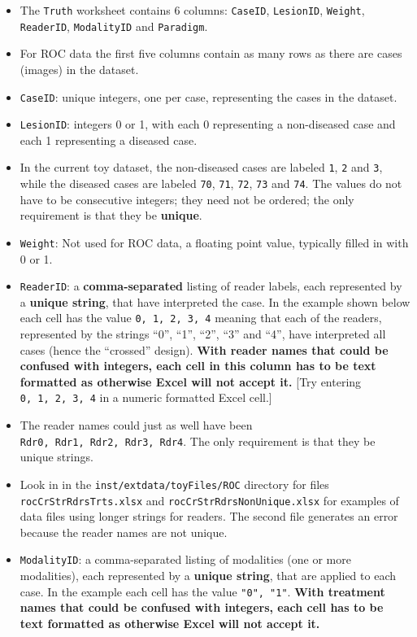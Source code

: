 \documentclass[
]{book}
\providecommand{\tightlist}{%
  \setlength{\itemsep}{0pt}\setlength{\parskip}{0pt}}
\begin{document}
\begin{itemize}
\tightlist
\item
  The \texttt{Truth} worksheet contains 6 columns: \texttt{CaseID}, \texttt{LesionID}, \texttt{Weight}, \texttt{ReaderID}, \texttt{ModalityID} and \texttt{Paradigm}.
\item
  For ROC data the first five columns contain as many rows as there are cases (images) in the dataset.
\item
  \texttt{CaseID}: unique integers, one per case, representing the cases in the dataset.
\item
  \texttt{LesionID}: integers 0 or 1, with each 0 representing a non-diseased case and each 1 representing a diseased case.
\item
  In the current toy dataset, the non-diseased cases are labeled \texttt{1}, \texttt{2} and \texttt{3}, while the diseased cases are labeled \texttt{70}, \texttt{71}, \texttt{72}, \texttt{73} and \texttt{74}. The values do not have to be consecutive integers; they need not be ordered; the only requirement is that they be \textbf{unique}.
\item
  \texttt{Weight}: Not used for ROC data, a floating point value, typically filled in with 0 or 1.
\item
  \texttt{ReaderID}: a \textbf{comma-separated} listing of reader labels, each represented by a \textbf{unique string}, that have interpreted the case. In the example shown below each cell has the value \texttt{0,\ 1,\ 2,\ 3,\ 4} meaning that each of the readers, represented by the strings ``0'', ``1'', ``2'', ``3'' and ``4'', have interpreted all cases (hence the ``crossed'' design). \textbf{With reader names that could be confused with integers, each cell in this column has to be text formatted as otherwise Excel will not accept it.} {[}Try entering \texttt{0,\ 1,\ 2,\ 3,\ 4} in a numeric formatted Excel cell.{]}
\item
  The reader names could just as well have been \texttt{Rdr0,\ Rdr1,\ Rdr2,\ Rdr3,\ Rdr4}. The only requirement is that they be unique strings.
\item
  Look in in the \texttt{inst/extdata/toyFiles/ROC} directory for files \texttt{rocCrStrRdrsTrts.xlsx} and \texttt{rocCrStrRdrsNonUnique.xlsx} for examples of data files using longer strings for readers. The second file generates an error because the reader names are not unique.
\item
  \texttt{ModalityID}: a comma-separated listing of modalities (one or more modalities), each represented by a \textbf{unique string}, that are applied to each case. In the example each cell has the value \texttt{"0",\ "1"}. \textbf{With treatment names that could be confused with integers, each cell has to be text formatted as otherwise Excel will not accept it.}

\end{itemize}
\end{document}
